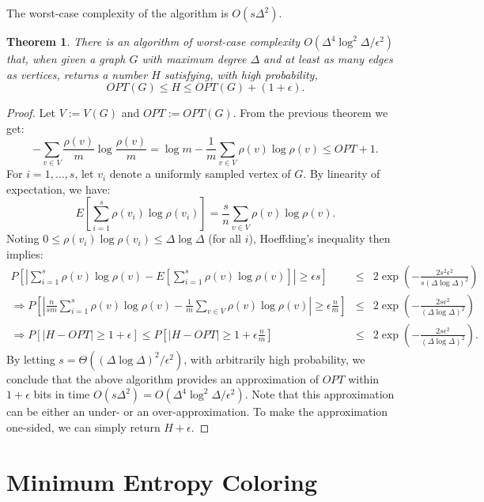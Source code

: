 \documentclass[10pt,a4paper]{article}
\newcommand{\OPT}{OPT}
\newtheorem{theorem}{Theorem}
\begin{document}
The worst-case complexity of the algorithm is $O(s\Delta^2)$. 

\begin{theorem}
\label{thm:ctapx}
There is an algorithm of worst-case complexity $O(\Delta^4 \log^2\Delta / \epsilon^2)$ that, when given a graph $G$ with maximum degree $\Delta$ and at least as many edges as vertices, returns a number $H$ satisfying, with high probability,
$$
\OPT(G) \leq H \leq \OPT(G) + (1 + \epsilon).
$$
\end{theorem}
\begin{proof}
Let $V := V(G)$ and $\OPT := \OPT(G)$. From the previous theorem we get:
$$
-\sum_{v\in V} \frac{\rho (v)}{m} \log \frac{\rho (v)}{m} = \log m - \frac 1m \sum_{v\in V} \rho (v) \log \rho (v) \leq \OPT + 1.
$$
For $i = 1, \ldots, s$, let $v_i$ denote a uniformly sampled vertex of $G$. By linearity of expectation, we have:
$$
E \left[\sum_{i=1}^s \rho(v_i) \log \rho(v_i)\right] = \frac sn \sum_{v\in V} \rho (v) \log \rho (v).
$$
Noting $0 \le \rho(v_i) \log \rho(v_i) \le \Delta \log \Delta$ (for all $i$), Hoeffding's inequality then implies:
\begin{eqnarray}
P\left[ \left| \sum_{i=1}^s \rho (v) \log \rho (v) - E\left[ \sum_{i=1}^s \rho (v) \log \rho (v)\right] \right| \geq \epsilon s \right] &  \leq  &
2\exp \left( - \frac{2s^2\epsilon^2}{s(\Delta \log \Delta)^2} \right) \nonumber \\
\Rightarrow
P\left[ \left| \frac n{sm} \sum_{i=1}^s \rho (v) \log \rho (v) - \frac 1m \sum_{v\in V} \rho (v) \log \rho (v) \right| \geq \epsilon \frac nm \right] &  \leq  &
2\exp \left( - \frac{2s\epsilon^2}{(\Delta \log \Delta)^2} \right)\nonumber \\
\Rightarrow
P\left[ \left| H - \OPT \right| \geq 1 + \epsilon \right] \leq
P\left[ \left| H - \OPT \right| \geq 1 + \epsilon \frac nm \right] & \leq & 2\exp \left( - \frac{2s\epsilon^2}{(\Delta \log \Delta)^2} \right). \nonumber
\end{eqnarray}
By letting $s=\Theta((\Delta \log \Delta)^2 / \epsilon^2)$, with arbitrarily high probability, we conclude that the above algorithm provides an approximation of $\OPT$ within $1+\epsilon$ bits in time $O(s\Delta^2) = O(\Delta^4\log^2\Delta / \epsilon^2)$. Note that this approximation can be either an under- or an over-approximation. To make the approximation one-sided, we can simply return $H + \epsilon$.
\end{proof}

\section{Minimum Entropy Coloring}
\end{document}
